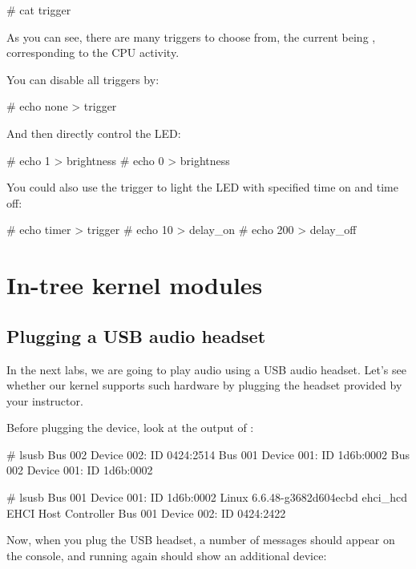 \begin{bashinput}
# cat trigger
\end{bashinput}

As you can see, there are many triggers to choose from, the current
being , corresponding to the CPU activity.

You can disable all triggers by:

\begin{bashinput}
# echo none > trigger
\end{bashinput}

And then directly control the LED:

\begin{bashinput}
# echo 1 > brightness
# echo 0 > brightness
\end{bashinput}

You could also use the  trigger to light the LED
with specified time on and time off:

\begin{bashinput}
# echo timer > trigger
# echo 10 > delay_on
# echo 200 > delay_off
\end{bashinput}

\section{In-tree kernel modules}
\subsection{Plugging a USB audio headset}

In the next labs, we are going to play audio using a USB audio headset.
Let's see whether our kernel supports such hardware by plugging the
headset provided by your instructor.

Before plugging the device, look at the output of :

\if{}
\begin{bashinput}
# lsusb
Bus 002 Device 002: ID 0424:2514
Bus 001 Device 001: ID 1d6b:0002
Bus 002 Device 001: ID 1d6b:0002
\end{bashinput}
\fi
\if{}
\begin{bashinput}
# lsusb
Bus 001 Device 001: ID 1d6b:0002 Linux 6.6.48-g3682d604ecbd ehci_hcd EHCI Host Controller
Bus 001 Device 002: ID 0424:2422
\end{bashinput}
\fi

Now, when you plug the USB headset, a number of messages should appear
on the console, and running  again should show an
additional device:

